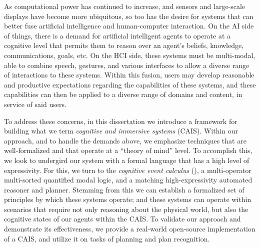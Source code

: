  

As computational power has continued to increase, and sensors and
large-scale displays have become more ubiquitous, so too has the
desire for
systems that can better fuse artificial intelligence and
human-computer interaction.  On the AI side of things, there is a
demand for artificial intelligent agents to operate at a cognitive
level that permits them to reason over an agent's beliefs, knowledge,
communications, goals, etc.  On the HCI side, these systems must be
multi-modal, able to combine speech, gestures, and various interfaces
to allow a diverse range of interactions to these systems.  Within
this fusion, users may develop reasonable and productive expectations
regarding the capabilities of these systems, and these capabilities
can then be applied to a diverse range of domains and content, in
service of said users.

To address these concerns, in this dissertation we introduce a
framework for building what we term \textit{cognitive and immersive
systems} (CAIS).  Within our approach, and to handle the demands
above, we emphasize techniques that are well-formalized and that
operate at a ``theory of mind'' level.  To accomplish this, we look to
undergird our system with a formal language that has a high level of
expressivity.  For this, we turn to the \textit{cognitive event
calculus} (\CEC), a multi-operator multi-sorted quantified modal
logic, and a matching high-expressivity automated reasoner and
planner.  Stemming from this we can establish a formalized set of
principles by which these systems operate; and these systems can
operate within scenarios that require not only reasoning about the
physical world, but also the cognitive states of our agents within the
CAIS.  To validate our approach and demonstrate its effectiveness, we
provide a real-world open-source implementation of a CAIS, and utilize
it on tasks of planning and plan recognition.